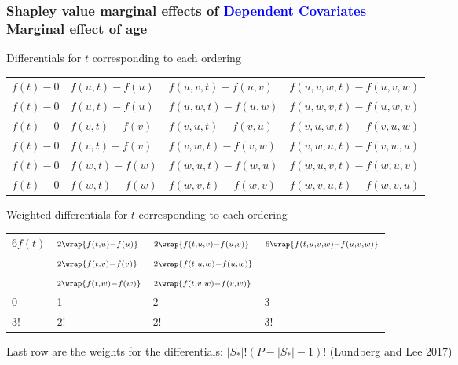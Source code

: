 \documentclass[11pt,dvipsnames,usenames,times]{beamer}
\newcommand*{\blue}[1]{\textcolor{blue}{#1}}%
\begin{document}
\begin{frame}
\frametitle{Shapley value marginal effects of \blue{Dependent Covariates}\\
Marginal effect of age}

Differentials for $t$ corresponding to each ordering

\begin{tabular}{llll}
$\scriptstyle f(t)-0$ & $\scriptstyle f(u,t)-f(u)$ & $\scriptstyle f(u,v,t)-f(u,v)$ & $\scriptstyle f(u,v,w,t)-f(u,v,w)$ \\
$\scriptstyle f(t)-0$ & $\scriptstyle f(u,t)-f(u)$ & $\scriptstyle f(u,w,t)-f(u,w)$ & $\scriptstyle f(u,w,v,t)-f(u,w,v)$ \\
$\scriptstyle f(t)-0$ & $\scriptstyle f(v,t)-f(v)$ & $\scriptstyle f(v,u,t)-f(v,u)$ & $\scriptstyle f(v,u,w,t)-f(v,u,w)$ \\
$\scriptstyle f(t)-0$ & $\scriptstyle f(v,t)-f(v)$ & $\scriptstyle f(v,w,t)-f(v,w)$ & $\scriptstyle f(v,w,u,t)-f(v,w,u)$ \\
$\scriptstyle f(t)-0$ & $\scriptstyle f(w,t)-f(w)$ & $\scriptstyle f(w,u,t)-f(w,u)$ & $\scriptstyle f(w,u,v,t)-f(w,u,v)$ \\
$\scriptstyle f(t)-0$ & $\scriptstyle f(w,t)-f(w)$ & $\scriptstyle f(w,v,t)-f(w,v)$ & $\scriptstyle f(w,v,u,t)-f(w,v,u)$ 
\end{tabular}

Weighted differentials for $t$ corresponding to each ordering
\begin{tabular}{llll}
$\scriptstyle 6{f(t)}$ & $\scriptstyle 2\wrap{ f(t,u)-f(u)}$ & 
$\scriptstyle 2\wrap{f(t,u,v)-f(u,v)}$ & $\scriptstyle 6\wrap{f(t,u,v,w)-f(u,v,w)}$ \\
 & $\scriptstyle 2\wrap{ f(t,v)-f(v)}$ & $\scriptstyle 2\wrap{f(t,u,w)-f(u,w)}$ & \\
 & $\scriptstyle 2\wrap{f(t,w)-f(w)}$ & $\scriptstyle 2\wrap{f(t,v,w)-f(v,w)}$ & \\ \hline
0 & 1 & 2 & 3 \\ \hline
$3!$ & $2!$ & $2!$ & $3!$
\\ \hline
\end{tabular}
Last row are the weights for the differentials: $|S_*|!(P-|S_*|-1)!$
(Lundberg and Lee 2017)
\end{frame} 
\end{document}
